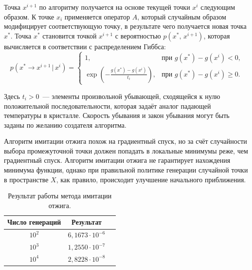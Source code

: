 Точка $x^{i+1}$ по алгоритму получается на основе текущей точки $x^i$ следующим образом. К точке $x_i$ применяется оператор $A$, который случайным образом модифицирует соответствующую точку, в результате чего получается новая точка $x^*$. Точка $x^*$ становится точкой $x^{i+1}$ с вероятностью $p(x^*,\,x^{i+1})$, которая вычисляется в соответствии с распределением Гиббса:
$$
        p(x^*\to x^{i+1}\,|\,x^i)
=
        \begin{cases}
1,
        &
\mbox{при $g(x^*) - g(x^i) < 0$,}
        \\
\exp\left(-\frac{g(x^*) - g(x^i)}{t_i}\right),
        &
\mbox{при $g(x^*) - g(x^i) \geqslant 0$}.
\end{cases}
$$

Здесь $t_i>0$~--- элементы произвольной убывающей, сходящейся к нулю положительной последовательности, которая задаёт аналог падающей температуры в кристалле. Скорость убывания и закон убывания могут быть заданы по желанию создателя алгоритма.

Алгоритм имитации отжига похож на градиентный спуск, но за счёт случайности выбора промежуточной точки должен попадать в локальные минимумы реже, чем градиентный спуск. Алгоритм имитации отжига не гарантирует нахождения минимума функции, однако при правильной политике генерации случайной точки в пространстве $X$, как правило, происходит улучшение начального приближения.

\clearpage
\begin{table}[t]
\begin{center}
\begin{tabular}{|c|c|c|}
\hline
Число генераций &
Результат 
\\
\hline
$10^2$
&
$6,\!1673\cdot10^{-6}$
\\
\hline
$10^3$
&
$1,\!2550\cdot10^{-7}$
\\
\hline
$10^4$
&
$2,\!8228\cdot10^{-8}$
\\
\hline
\end{tabular}
\end{center}
\caption{Результат работы метода имитации отжига.}
\end{table}

